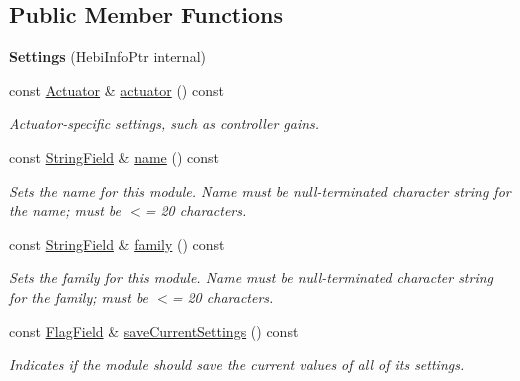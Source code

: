 \subsection*{Public Member Functions}
\begin{DoxyCompactItemize}
\item 
{\bfseries Settings} (Hebi\+Info\+Ptr internal)\hypertarget{classhebi_1_1Info_1_1Settings_ac69626b8a3efd4533b01ab75042471b9}{}\label{classhebi_1_1Info_1_1Settings_ac69626b8a3efd4533b01ab75042471b9}

\item 
const \hyperlink{classhebi_1_1Info_1_1Settings_1_1Actuator}{Actuator} \& \hyperlink{classhebi_1_1Info_1_1Settings_a5b58464bf08d437ceb339268fe1323bf}{actuator} () const \hypertarget{classhebi_1_1Info_1_1Settings_a5b58464bf08d437ceb339268fe1323bf}{}\label{classhebi_1_1Info_1_1Settings_a5b58464bf08d437ceb339268fe1323bf}

\begin{DoxyCompactList}\small\item\em Actuator-\/specific settings, such as controller gains. \end{DoxyCompactList}\item 
const \hyperlink{classhebi_1_1Info_1_1StringField}{String\+Field} \& \hyperlink{classhebi_1_1Info_1_1Settings_ac69041bf666cb7746936efe9da3a2d48}{name} () const \hypertarget{classhebi_1_1Info_1_1Settings_ac69041bf666cb7746936efe9da3a2d48}{}\label{classhebi_1_1Info_1_1Settings_ac69041bf666cb7746936efe9da3a2d48}

\begin{DoxyCompactList}\small\item\em Sets the name for this module. Name must be null-\/terminated character string for the name; must be $<$= 20 characters. \end{DoxyCompactList}\item 
const \hyperlink{classhebi_1_1Info_1_1StringField}{String\+Field} \& \hyperlink{classhebi_1_1Info_1_1Settings_a84dde1fcaf18972c24c8bed7f585b5eb}{family} () const \hypertarget{classhebi_1_1Info_1_1Settings_a84dde1fcaf18972c24c8bed7f585b5eb}{}\label{classhebi_1_1Info_1_1Settings_a84dde1fcaf18972c24c8bed7f585b5eb}

\begin{DoxyCompactList}\small\item\em Sets the family for this module. Name must be null-\/terminated character string for the family; must be $<$= 20 characters. \end{DoxyCompactList}\item 
const \hyperlink{classhebi_1_1Info_1_1FlagField}{Flag\+Field} \& \hyperlink{classhebi_1_1Info_1_1Settings_a19bfaed3afce11ed592b9fdf7a8b6ef5}{save\+Current\+Settings} () const \hypertarget{classhebi_1_1Info_1_1Settings_a19bfaed3afce11ed592b9fdf7a8b6ef5}{}\label{classhebi_1_1Info_1_1Settings_a19bfaed3afce11ed592b9fdf7a8b6ef5}

\begin{DoxyCompactList}\small\item\em Indicates if the module should save the current values of all of its settings. \end{DoxyCompactList}\end{DoxyCompactItemize}


